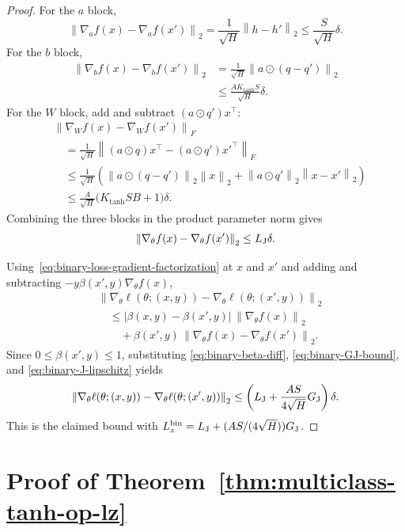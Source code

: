 \documentclass[11pt,a4paper]{report}
\theoremstyle{plain}
\theoremstyle{definition}
\theoremstyle{remark}
\newcommand{\norm}[1]{\left\lVert #1\right\rVert}
\begin{document}
\begin{proof}
For the $a$ block,
\[
\norm{\nabla_a f(x)-\nabla_a f(x')}_2
=
\frac1{\sqrt H}\norm{h-h'}_2
\le
\frac{S}{\sqrt H}\delta.
\]
For the $b$ block,
\begin{align*}
\norm{\nabla_b f(x)-\nabla_b f(x')}_2
&=
\frac1{\sqrt H}\norm{a\odot(q-q')}_2\\
&\le
\frac{AK_{\tanh}S}{\sqrt H}\delta.
\end{align*}
For the $W$ block, add and subtract $(a\odot q')x^\top$:
\begin{align*}
&\norm{\nabla_W f(x)-\nabla_W f(x')}_F\\
&\quad=
\frac1{\sqrt H}
\norm{(a\odot q)x^\top-(a\odot q')x'^\top}_F\\
&\quad\le
\frac1{\sqrt H}\left(
\norm{a\odot(q-q')}_2\norm{x}_2
+
\norm{a\odot q'}_2\norm{x-x'}_2
\right)\\
&\quad\le
\frac{A}{\sqrt H}\bigl(K_{\tanh}SB+1\bigr)\delta.
\end{align*}
Combining the three blocks in the product parameter norm gives
\begin{equation}
\label{eq:binary-J-lipschitz}
\norm{\nabla_\theta f(x)-\nabla_\theta f(x')}_2
\le
L_{\rm J}\delta.
\end{equation}

Using~\eqref{eq:binary-loss-gradient-factorization} at $x$ and $x'$ and adding
and subtracting $-y\beta(x',y)\nabla_\theta f(x)$,
\begin{align*}
&\norm{\nabla_\theta\ell(\theta;(x,y))
-
\nabla_\theta\ell(\theta;(x',y))}_2\\
&\quad\le
|\beta(x,y)-\beta(x',y)|\,\norm{\nabla_\theta f(x)}_2\\
&\qquad+
\beta(x',y)\,
\norm{\nabla_\theta f(x)-\nabla_\theta f(x')}_2.
\end{align*}
Since $0\le\beta(x',y)\le1$, substituting
\eqref{eq:binary-beta-diff}, \eqref{eq:binary-GJ-bound}, and
\eqref{eq:binary-J-lipschitz} yields
\[
\norm{\nabla_\theta\ell(\theta;(x,y))
-
\nabla_\theta\ell(\theta;(x',y))}_2
\le
\left(L_{\rm J}+\frac{AS}{4\sqrt H}G_{\rm J}\right)\delta.
\]
This is the claimed bound with $L_z^{\rm bin}=L_{\rm J}+(AS/(4\sqrt H))G_{\rm J}$.
\end{proof}

\section{Proof of Theorem~\ref{thm:multiclass-tanh-op-lz}}
\label{app:multiclass-tanh-proof}
\end{document}
